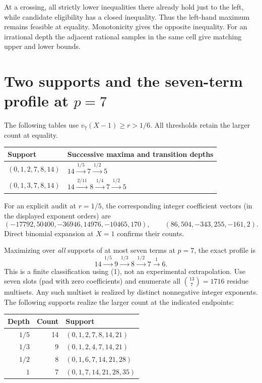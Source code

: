 \documentclass[11pt]{article}
\begin{document}
At a crossing, all strictly lower inequalities there already
hold just to the left, while candidate eligibility has a closed
inequality. Thus the left-hand maximum remains feasible at
equality. Monotonicity gives the opposite inequality. For an
irrational depth the adjacent rational samples in the same
cell give matching upper and lower bounds.
\newpage
\section{Two supports and the seven-term profile at \(p=7\)}
The following tables use \(v_7(X-1)\ge r>1/6\).
All thresholds retain the larger count at equality.
\begin{center}
\begin{tabular}{ll}
\toprule
Support & Successive maxima and transition depths\\
\midrule
\((0,1,2,7,8,14)\) & \(14\xrightarrow{\,1/5\,}7\xrightarrow{\,1/2\,}5\)\\
\((0,1,3,7,8,14)\) & \(14\xrightarrow{\,2/11\,}8\xrightarrow{\,1/4\,}7
          \xrightarrow{\,1/2\,}5\)\\
\bottomrule
\end{tabular}
\end{center}
For an explicit audit at \(r=1/5\), the corresponding integer
coefficient vectors (in the displayed exponent orders) are
\[
 (-17792,50400,-36946,14976,-10465,170),\qquad
 (86,504,-343,255,-161,2).
\]
Direct binomial expansion at \(X=1\) confirms their counts.

Maximizing over \emph{all} supports of at most seven terms at \(p=7\),
the exact profile is
\[
       14\xrightarrow{\,1/5\,}9\xrightarrow{\,1/3\,}8
          \xrightarrow{\,1/2\,}7\xrightarrow{\,1\,}6 .
\]
This is a finite classification using (1), not an experimental
extrapolation. Use seven slots (pad with zero coefficients) and
enumerate all \(\binom{13}{7}=1716\) residue multisets. Any such
multiset is realized by distinct nonnegative integer exponents.
The following supports realize the larger count at the indicated
endpoints:
\begin{center}
\begin{tabular}{rrl}
\toprule
Depth & Count & Support\\
\midrule
\(1/5\)&14&\((0,1,2,7,8,14,21)\)\\
\(1/3\)&9&\((0,1,2,4,7,14,21)\)\\
\(1/2\)&8&\((0,1,6,7,14,21,28)\)\\
\(1\)&7&\((0,1,7,14,21,28,35)\)\\
\bottomrule
\end{tabular}
\end{center}
\end{document}
